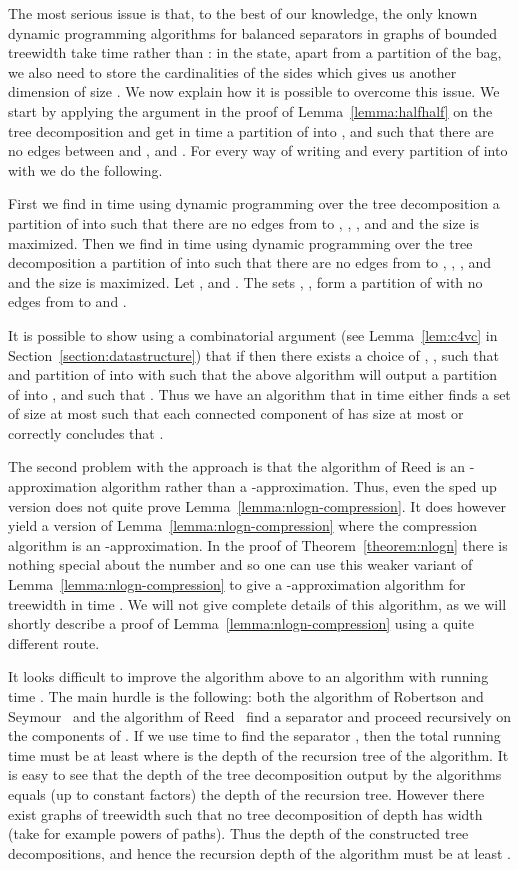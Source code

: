 \documentclass[a4paper,11pt]{article}
\theoremstyle{definition}
\theoremstyle{remark}
\begin{document}
The most serious issue is that, to the best of our knowledge, the only
known dynamic programming algorithms for balanced separators in graphs
of bounded treewidth take time  rather than : in
the state, apart from a partition of the bag, we also need to store
the cardinalities of the sides which gives us another dimension of
size .  We now explain how it is possible to overcome this issue.
We start by applying the argument in the proof of
Lemma~\ref{lemma:halfhalf} on the tree decomposition  and
get in time  a partition of  into ,  and
 such that there are no edges between  and ,
 and .  For every way of writing  and
every partition of  into  with  we do the following.

First we find in time  using dynamic programming over the
tree decomposition  a partition of  into
 such that there are no edges
from  to , , ,  and  and the size  is maximized.  Then we find in
time  using dynamic programming over the tree decomposition
 a partition of  into  such that there are no edges from  to
, , ,
 and  and the size
 is maximized.  Let ,  and .  The sets , ,  form a partition
of  with no edges from  to  and .

It is possible to show using a combinatorial argument (see
Lemma~\ref{lem:c4vc} in Section~\ref{section:datastructure}) that if
 then there exists a choice of , ,  such
that  and partition of  into  with  such that the above algorithm will output
a partition of  into ,  and  such that .  Thus we have an algorithm that in time 
either finds a set  of size at most  such that each connected
component of  has size at most  or
correctly concludes that .

\smallskip

The second problem with the approach is that the algorithm of Reed is
an -approximation algorithm rather than a -approximation.  Thus,
even the sped up version does not quite prove
Lemma~\ref{lemma:nlogn-compression}.  It does however yield a version
of Lemma~\ref{lemma:nlogn-compression} where the compression algorithm
is an -approximation.  In the proof of Theorem~\ref{theorem:nlogn}
there is nothing special about the number  and so one can use this
weaker variant of Lemma~\ref{lemma:nlogn-compression} to give a
-approximation algorithm for treewidth in time .
We will not give complete details of this algorithm, as we will
shortly describe a proof of Lemma~\ref{lemma:nlogn-compression} using
a quite different route.

It looks difficult to improve the algorithm above to an algorithm with
running time .  The main hurdle is the following: both the
algorithm of Robertson and Seymour~\cite{RobertsonS13} and the
algorithm of Reed~\cite{Reed92} find a separator  and proceed
recursively on the components of .  If we use  time to find the separator , then the total running time
must be at least  where  is the depth of
the recursion tree of the algorithm.  It is easy to see that the depth
of the tree decomposition output by the algorithms equals (up to
constant factors) the depth of the recursion tree.  However there
exist graphs of treewidth  such that no tree decomposition of depth
 has width  (take for example powers of paths).  Thus
the depth of the constructed tree decompositions, and hence the
recursion depth of the algorithm must be at least .
\end{document}

